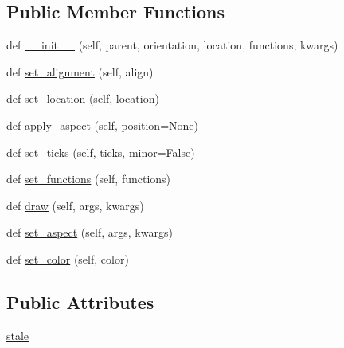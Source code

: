 \subsection*{Public Member Functions}
\begin{DoxyCompactItemize}
\item 
def \hyperlink{classmatplotlib_1_1axes_1_1__secondary__axes_1_1SecondaryAxis_ae2fe56e476a322bc7cfbd1fa0f3592a8}{\+\_\+\+\_\+init\+\_\+\+\_\+} (self, parent, orientation, location, functions, kwargs)
\item 
def \hyperlink{classmatplotlib_1_1axes_1_1__secondary__axes_1_1SecondaryAxis_a65fc47bd8e119a98811d1136b9d13448}{set\+\_\+alignment} (self, align)
\item 
def \hyperlink{classmatplotlib_1_1axes_1_1__secondary__axes_1_1SecondaryAxis_a01c3fe5131bcbf97a6d0bc596b45f156}{set\+\_\+location} (self, location)
\item 
def \hyperlink{classmatplotlib_1_1axes_1_1__secondary__axes_1_1SecondaryAxis_adc1b16b289d2ba79f884dac13285b3cd}{apply\+\_\+aspect} (self, position=None)
\item 
def \hyperlink{classmatplotlib_1_1axes_1_1__secondary__axes_1_1SecondaryAxis_ab24ced668bffde6602b58633ea89577c}{set\+\_\+ticks} (self, ticks, minor=False)
\item 
def \hyperlink{classmatplotlib_1_1axes_1_1__secondary__axes_1_1SecondaryAxis_ac007da95cdd793bb39a4a5f7657b9dcb}{set\+\_\+functions} (self, functions)
\item 
def \hyperlink{classmatplotlib_1_1axes_1_1__secondary__axes_1_1SecondaryAxis_ae31a13f479a19c05032c682d7c200b0e}{draw} (self, args, kwargs)
\item 
def \hyperlink{classmatplotlib_1_1axes_1_1__secondary__axes_1_1SecondaryAxis_a11570e1c4601785a4629fc696cf0c0d5}{set\+\_\+aspect} (self, args, kwargs)
\item 
def \hyperlink{classmatplotlib_1_1axes_1_1__secondary__axes_1_1SecondaryAxis_af21aa462db14a70a8ae54e5aea4af4a9}{set\+\_\+color} (self, color)
\end{DoxyCompactItemize}
\subsection*{Public Attributes}
\begin{DoxyCompactItemize}
\item 
\hyperlink{classmatplotlib_1_1axes_1_1__secondary__axes_1_1SecondaryAxis_ab4bd90fd336837cbeefc3f41ea90a30f}{stale}
\end{DoxyCompactItemize}
